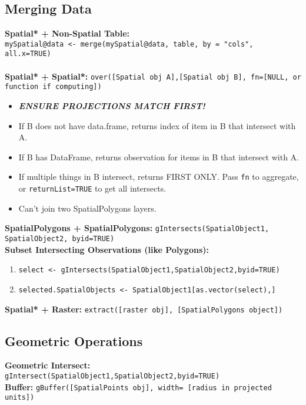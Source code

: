 \documentclass[10pt]{article}
\begin{document}
\subsection*{Merging Data}

\textbf{Spatial* + Non-Spatial Table:} \\
\texttt{mySpatial@data <- merge(mySpatial@data, table, by = "cols", all.x=TRUE)}\\
\\
\textbf{Spatial* + Spatial*:} \texttt{over([Spatial obj A],[Spatial obj B], fn=[NULL, or function if computing])}
\begin{itemize}
	\item \textbf\emph{{ENSURE PROJECTIONS MATCH FIRST!}}
	\item If B does not have data.frame, returns index of item in B that intersect with A. 
	\item If B has DataFrame, returns observation for items in B that intersect with A. 
	\item If multiple things in B intersect, returns FIRST ONLY. Pass \texttt{fn} to aggregate, or \texttt{returnList=TRUE} to get all intersects. 
	\item Can't join two SpatialPolygons layers. 
\end{itemize}
\textbf{SpatialPolygons + SpatialPolygons:} \texttt{gIntersects(SpatialObject1, SpatialObject2, byid=TRUE)}\\
\textbf{Subset Intersecting Observations (like Polygons):}
\begin{enumerate}
	\item \texttt{select <- gIntersects(SpatialObject1,SpatialObject2,byid=TRUE)} 
	\item \texttt{selected.SpatialObjects <- SpatialObject1[as.vector(select),]}
\end{enumerate} 
\textbf{Spatial* + Raster:} \texttt{extract([raster obj], [SpatialPolygons object])}


\hrulefill 
\subsection*{Geometric Operations}
\textbf{Geometric Intersect:} \texttt{gIntersect(SpatialObject1,SpatialObject2,byid=TRUE)}\\
\textbf{Buffer:} \texttt{gBuffer([SpatialPoints obj], width= [radius in projected units])}\\


\hrulefill 	
\end{document}
